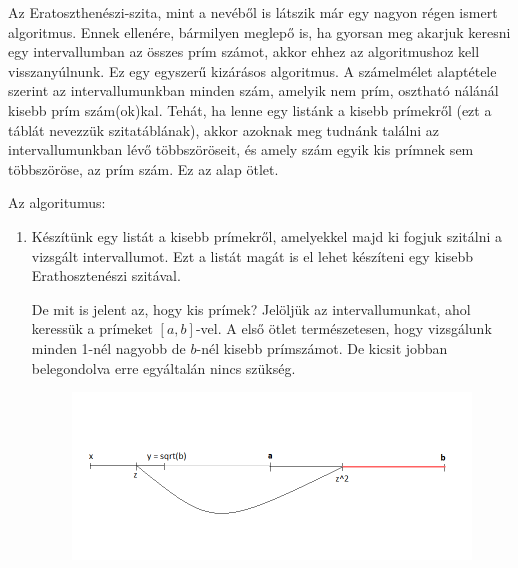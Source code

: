 \documentclass[twoside, a4paper, 12pt]{article}
\begin{document}
Az Eratoszthenészi-szita, mint a nevéből is látszik már egy nagyon régen ismert algoritmus. Ennek ellenére, bármilyen meglepő is, ha gyorsan meg akarjuk keresni egy intervallumban az összes prím számot, akkor ehhez az algoritmushoz kell visszanyúlnunk. Ez egy egyszerű kizárásos algoritmus. A számelmélet alaptétele szerint az intervallumunkban minden szám, amelyik nem prím, osztható nálánál kisebb prím szám(ok)kal. Tehát, ha lenne egy listánk a kisebb prímekről (ezt a táblát nevezzük szitatáblának), akkor azoknak meg tudnánk találni az intervallumunkban lévő többszöröseit, és amely szám egyik kis prímnek sem többszöröse, az prím szám. Ez az alap ötlet. \par
Az algoritumus: \par
\begin{enumerate}
\item Készítünk egy listát a kisebb prímekről, amelyekkel majd ki fogjuk szitálni a vizsgált intervallumot. Ezt a listát magát is el lehet készíteni egy kisebb Erathosztenészi szitával. \par
De mit is jelent az, hogy kis prímek? Jelöljük az intervallumunkat, ahol keressük a prímeket \( [a, b] \)-vel. A első ötlet természetesen, hogy vizsgálunk minden 1-nél nagyobb de \(b\)-nél kisebb prímszámot. De kicsit jobban belegondolva erre egyáltalán nincs szükség. \par 

\begin{figure}[h]
\includegraphics[width=\textwidth]{img/erat.png}
\caption{}
\end{figure}


\end{enumerate}
\end{document}
